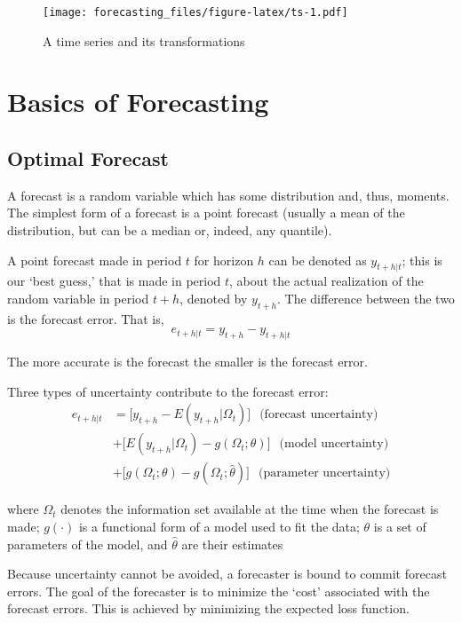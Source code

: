 \documentclass[
  oneside]{book}
\begin{document}
\begin{figure}
\centering
\texttt{[image: forecasting\_files/figure-latex/ts-1.pdf]}
\caption{\label{fig:ts}A time series and its transformations}
\end{figure}

\hypertarget{basics-of-forecasting}{%
\chapter{Basics of Forecasting}\label{basics-of-forecasting}}

\hypertarget{optimal-forecast}{%
\section{Optimal Forecast}\label{optimal-forecast}}

A forecast is a random variable which has some distribution and, thus, moments. The simplest form of a forecast is a point forecast (usually a mean of the distribution, but can be a median or, indeed, any quantile).

A point forecast made in period \(t\) for horizon \(h\) can be denoted as \(y_{t+h|t}\); this is our `best guess,' that is made in period \(t\), about the actual realization of the random variable in period \(t+h\), denoted by \(y_{t+h}\). The difference between the two is the forecast error. That is, \[e_{t+h|t} = y_{t+h} - y_{t+h|t}\]

The more accurate is the forecast the smaller is the forecast error.

Three types of uncertainty contribute to the forecast error:
\[\begin{aligned}
        e_{t+h|t} & = \big[y_{t+h}-E(y_{t+h}|\Omega_{t})\big]\;~~\text{(forecast uncertainty)}  \\
        & + \big[E(y_{t+h}|\Omega_{t}) - g(\Omega_{t};\theta)\big]\;~~\text{(model uncertainty)}  \\
        & + \big[g(\Omega_{t};\theta)-g(\Omega_{t};\hat{\theta})\big]\;~~\text{(parameter uncertainty)}
        \end{aligned}\]

where \(\Omega_t\) denotes the information set available at the time when the forecast is made; \(g(\cdot)\) is a functional form of a model used to fit the data; \(\theta\) is a set of parameters of the model, and \(\hat{\theta}\) are their estimates

Because uncertainty cannot be avoided, a forecaster is bound to commit forecast errors. The goal of the forecaster is to minimize the `cost' associated with the forecast errors. This is achieved by minimizing the expected loss function.
\end{document}
